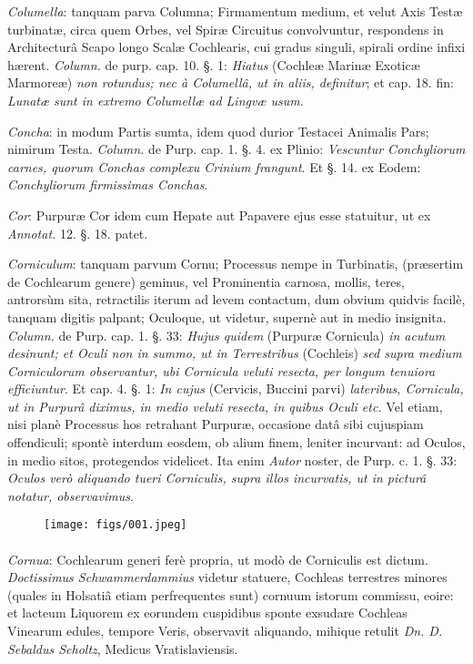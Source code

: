 \documentclass[a4paper, 11pt, oneside, polutonikogreek, german]{article}
\begin{document}
\emph{Columella}: tanquam parva Columna; Firmamentum medium, et velut Axis Testæ turbinatæ, circa quem Orbes, vel Spiræ Circuitus convolvuntur, respondens in Architecturâ Scapo longo Scalæ Cochlearis, cui gradus singuli, spirali ordine infixi hærent. \emph{Column.} de purp. cap. 10. §. 1: \emph{Hiatus} (Cochleæ Marinæ Exoticæ Marmoreæ) \emph{non rotundus; nec à Columellâ, ut in aliis, definitur}; et cap. 18. fin: \emph{Lunatæ sunt in extremo Columellæ ad Lingvæ usum}.

\emph{Concha}: in modum Partis sumta, idem quod durior Testacei Animalis Pars; nimirum Testa. \emph{Column.} de Purp. cap. 1. §. 4. ex Plinio: \emph{Vescuntur Conchyliorum carnes, quorum Conchas complexu Crinium frangunt}. Et §. 14. ex Eodem: \emph{Conchyliorum firmissimas Conchas}.

\emph{Cor}: Purpuræ Cor idem cum Hepate aut Papavere ejus esse statuitur, ut ex \emph{Annotat.} 12. §. 18. patet.

\emph{Corniculum}: tanquam parvum Cornu; Processus nempe in Turbinatis, (præsertim de Cochlearum genere) geminus, vel Prominentia carnosa, mollis, teres, antrorsùm sita, retractilis iterum ad levem contactum, dum obvium quidvis facilè, tanquam digitis palpant; Oculoque, ut videtur, supernè aut in medio insignita. \emph{Column.} de Purp. cap. 1. §. 33: \emph{Hujus quidem} (Purpuræ Cornicula) \emph{in acutum desinunt; et Oculi non in summo, ut in Terrestribus} (Cochleis) \emph{sed supra medium Corniculorum observantur, ubi Cornicula veluti resecta, per longum tenuiora efficiuntur}. Et cap. 4. §. 1: \emph{In cujus} (Cervicis, Buccini parvi) \emph{lateribus, Cornicula, ut in Purpurâ diximus, in medio veluti resecta, in quibus Oculi etc.} Vel etiam, nisi planè Processus hos retrahant Purpuræ, occasione datâ sibi cujuspiam offendiculi; spontè interdum eosdem, ob alium finem, leniter incurvant: ad Oculos, in medio sitos, protegendos videlicet. Ita enim \emph{Autor} noster, de Purp. c. 1. §. 33: \emph{Oculos verò aliquando tueri Corniculis, supra illos incurvatis, ut in picturâ notatur, observavimus}.

\begin{figure}[H]
\centering
\texttt{[image: figs/001.jpeg]}
\end{figure}
\paragraph{}
\emph{Cornua}: Cochlearum generi ferè propria, ut modò de Corniculis est dictum. \emph{Doctissimus Schwammerdammius} videtur statuere, Cochleas terrestres minores (quales in Holsatiâ etiam perfrequentes sunt) cornuum istorum commissu, eoire: et lacteum Liquorem ex eorundem cuspidibus sponte exsudare Cochleas Vinearum edules, tempore Veris, observavit aliquando, mihique retulit \emph{Dn. D. Sebaldus Scholtz}, Medicus Vratislaviensis.
\end{document}
